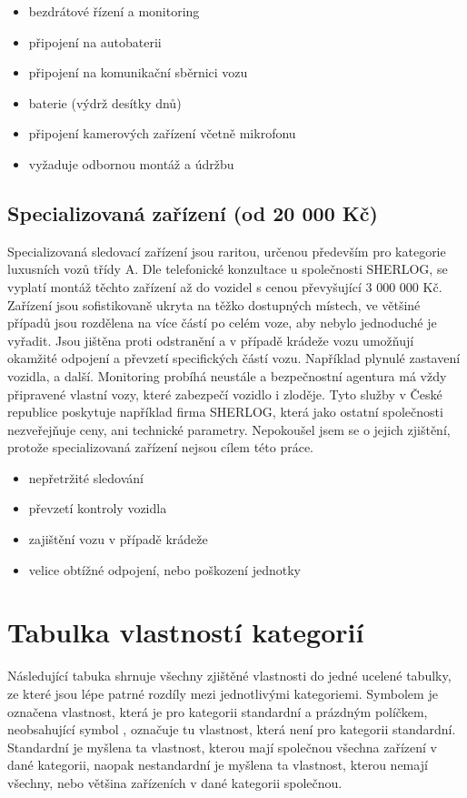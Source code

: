 \documentclass[FM,BP]{tulthesis}  %
\begin{document}
\begin{itemize}
\item bezdrátové řízení a monitoring
\item připojení na autobaterii
\item připojení na komunikační sběrnici vozu
\item baterie (výdrž desítky dnů)
\item připojení kamerových zařízení včetně mikrofonu
\item vyžaduje odbornou montáž a údržbu
\end{itemize}

\subsection{Specializovaná zařízení (od 20 000 Kč)}
Specializovaná sledovací zařízení jsou raritou, určenou především pro kategorie luxusních vozů třídy A. Dle telefonické konzultace u společnosti SHERLOG, se vyplatí montáž těchto zařízení až do vozidel s cenou převyšující 3 000 000 Kč. Zařízení jsou sofistikovaně ukryta na těžko dostupných místech, ve většiné případů jsou rozdělena na více částí po celém voze, aby nebylo jednoduché je vyřadit. Jsou jištěna proti odstranění a v případě krádeže vozu umožňují okamžité odpojení a převzetí specifických částí vozu. Například plynulé zastavení vozidla, a další. Monitoring probíhá neustále a bezpečnostní agentura má vždy připravené vlastní vozy, které zabezpečí vozidlo i zloděje. Tyto služby v České republice poskytuje například firma SHERLOG, která jako ostatní společnosti nezveřejňuje ceny, ani technické parametry. Nepokoušel jsem se o jejich zjištění, protože specializovaná zařízení nejsou cílem této práce. 

\begin{itemize}
\item nepřetržité sledování
\item převzetí kontroly vozidla
\item zajištění vozu v případě krádeže
\item velice obtížné odpojení, nebo poškození jednotky
\end{itemize}


\section{Tabulka vlastností kategorií}
Následující tabuka shrnuje všechny zjištěné vlastnosti do jedné ucelené tabulky, ze které jsou lépe patrné rozdíly mezi jednotlivými kategoriemi. Symbolem  je označena vlastnost, která je pro kategorii standardní a prázdným políčkem, neobsahující symbol , označuje tu vlastnost, která není pro kategorii standardní. Standardní je myšlena ta vlastnost, kterou mají společnou všechna zařízení v dané kategorii, naopak nestandardní je myšlena ta vlastnost, kterou nemají všechny, nebo většina zařízeních v dané kategorii společnou.
\end{document}
